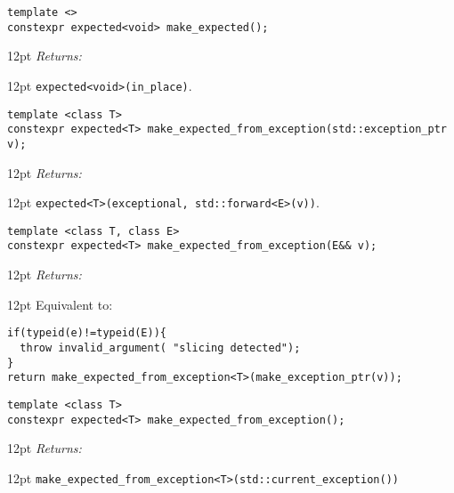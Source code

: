 \documentclass[a4paper,10pt]{article}
\newcommand{\cpp}[1]{\lstinline{#1}}
\newcommand{\wordingItem}[1]{\noindent\textit{#1:}}
\newenvironment{wordingTextItem}[1]{\wordingItem{#1}\vspace{7pt}\noindent\begin{adjustwidth}{12pt}{}}{\vspace{7pt}\end{adjustwidth}}
\newenvironment{wordingPara}{\begin{adjustwidth}{12pt}{}}{\end{adjustwidth}}
\begin{document}
\begin{lstlisting}[xleftmargin=0pt]
template <>
constexpr expected<void> make_expected(); 
\end{lstlisting}
\begin{wordingPara}
\begin{wordingTextItem}{Returns}
\cpp{expected<void>(in_place)}.
\end{wordingTextItem}
\end{wordingPara}

\begin{lstlisting}[xleftmargin=0pt]
template <class T>
constexpr expected<T> make_expected_from_exception(std::exception_ptr v); 
\end{lstlisting}
\begin{wordingPara}
\begin{wordingTextItem}{Returns}
\cpp{expected<T>(exceptional, std::forward<E>(v))}.
\end{wordingTextItem}
\end{wordingPara}

\begin{lstlisting}[xleftmargin=0pt]
template <class T, class E>
constexpr expected<T> make_expected_from_exception(E&& v);
\end{lstlisting}
\begin{wordingPara}
\begin{wordingTextItem}{Returns}
Equivalent to:
\begin{lstlisting}
if(typeid(e)!=typeid(E)){
  throw invalid_argument( "slicing detected");
}
return make_expected_from_exception<T>(make_exception_ptr(v));
\end{lstlisting}
\end{wordingTextItem}
\end{wordingPara}


\begin{lstlisting}[xleftmargin=0pt]
template <class T>
constexpr expected<T> make_expected_from_exception(); 
\end{lstlisting}
\begin{wordingPara}
\begin{wordingTextItem}{Returns}
\cpp{make_expected_from_exception<T>(std::current_exception())}
\end{wordingTextItem}
\end{wordingPara}
\end{document}

